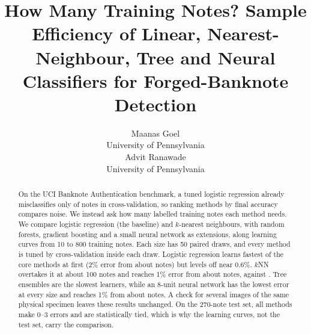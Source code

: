 \documentclass{article}
\title{How Many Training Notes? Sample Efficiency of Linear, Nearest-Neighbour, Tree and Neural Classifiers for Forged-Banknote Detection}
\author{%
  Maanas Goel \\
  University of Pennsylvania \\
  \And
  Advit Ranawade \\
  University of Pennsylvania \\
}
\begin{document}
\maketitle

\begin{abstract}
On the UCI Banknote Authentication benchmark, a tuned logistic regression already misclassifies only \LRcv{} of notes in cross-validation, so ranking methods by final accuracy compares noise. We instead ask how many labelled training notes each method needs. We compare logistic regression (the baseline) and $k$-nearest neighbours, with random forests, gradient boosting and a small neural network as extensions, along learning curves from 10 to 800 training notes. Each size has 50 paired draws, and every method is tuned by cross-validation inside each draw. Logistic regression learns fastest of the core methods at first (2\% error from about \reachLRTwo{} notes) but levels off near 0.6\%. $k$NN overtakes it at about 100 notes and reaches 1\% error from about \reachKNNOne{} notes, against \reachLROne{}. Tree ensembles are the slowest learners, while an 8-unit neural network has the lowest error at every size and reaches 1\% from about \reachNNOne{} notes. A check for several images of the same physical specimen leaves these results unchanged. On the 270-note test set, all methods make 0--3 errors and are statistically tied, which is why the learning curves, not the test set, carry the comparison.
\end{abstract}





\end{document}
